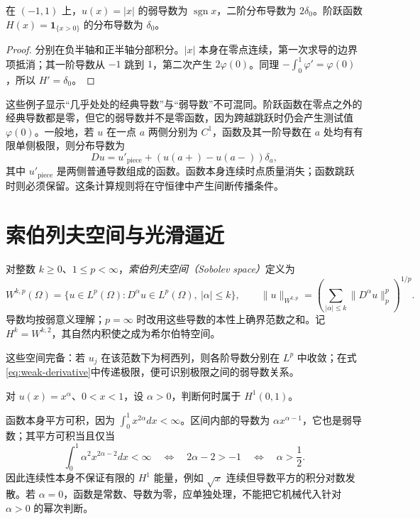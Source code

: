 \begin{example}
在 $(-1,1)$ 上，$u(x)=|x|$ 的弱导数为 $\operatorname{sgn}x$，二阶分布导数为 $2\delta_0$。阶跃函数 $H(x)=\mathbf1_{\{x>0\}}$ 的分布导数为 $\delta_0$。
\end{example}
\begin{proof}
分别在负半轴和正半轴分部积分。$|x|$ 本身在零点连续，第一次求导的边界项抵消；其一阶导数从 $-1$ 跳到 $1$，第二次产生 $2\varphi(0)$。同理 $-\int_0^1\varphi'=\varphi(0)$，所以 $H'=\delta_0$。
\end{proof}

这些例子显示“几乎处处的经典导数”与“弱导数”不可混同。阶跃函数在零点之外的经典导数都是零，但它的弱导数并不是零函数，因为跨越跳跃时仍会产生测试值 $\varphi(0)$。一般地，若 $u$ 在一点 $a$ 两侧分别为 $C^1$，函数及其一阶导数在 $a$ 处均有有限单侧极限，则分布导数为
\[
 Du=u'_{\mathrm{piece}}+(u(a+)-u(a-))\delta_a,
\]
其中 $u'_{\mathrm{piece}}$ 是两侧普通导数组成的函数。函数本身连续时点质量消失；函数跳跃时则必须保留。这条计算规则将在守恒律中产生间断传播条件。

\section{索伯列夫空间与光滑逼近}
\begin{definition}
对整数 $k\ge0$、$1\le p<\infty$，\emph{索伯列夫空间（Sobolev space）}定义为
\[
 W^{k,p}(\Omega)=\{u\in L^p(\Omega):D^\alpha u\in L^p(\Omega),\ |\alpha|\le k\},\qquad
 \|u\|_{W^{k,p}}=\left(\sum_{|\alpha|\le k}\|D^\alpha u\|_p^p\right)^{1/p}.
\]
导数均按弱意义理解；$p=\infty$ 时改用这些导数的本性上确界范数之和。记 $H^k=W^{k,2}$，其自然内积使之成为希尔伯特空间。
\end{definition}
这些空间完备：若 $u_j$ 在该范数下为柯西列，则各阶导数分别在 $L^p$ 中收敛；在式\eqref{eq:weak-derivative}中传递极限，便可识别极限之间的弱导数关系。

\begin{example}[尖角可以多尖]
对 $u(x)=x^\alpha$、$0<x<1$，设 $\alpha>0$，判断何时属于 $H^1(0,1)$。
\end{example}
\begin{solve}
函数本身平方可积，因为 $\int_0^1x^{2\alpha}dx<\infty$。区间内部的导数为 $\alpha x^{\alpha-1}$，它也是弱导数；其平方可积当且仅当
\[
 \int_0^1\alpha^2x^{2\alpha-2}dx<\infty
 \quad\Longleftrightarrow\quad 2\alpha-2>-1
 \quad\Longleftrightarrow\quad \alpha>\frac12.
\]
因此连续性本身不保证有限的 $H^1$ 能量，例如 $\sqrt{x}$ 连续但导数平方的积分对数发散。若 $\alpha=0$，函数是常数、导数为零，应单独处理，不能把它机械代入针对 $\alpha>0$ 的幂次判断。
\end{solve}

